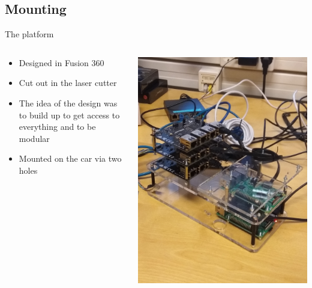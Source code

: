 \documentclass{beamer}
\begin{document}
\subsection{Mounting}
\begin{frame}{The platform}

    \begin{columns}
        \begin{column}{0.47\textwidth}
            \begin{itemize}
                \item  Designed in Fusion 360
                \item  Cut out in the laser cutter
                \item  The idea of the design was to build up to get access to everything and to be modular
                \item Mounted on the car via two holes 
            \end{itemize}
        \end{column}
        \begin{column}{0.5\textwidth}
            \includegraphics[width=0.7\linewidth]{platform.jpg}
            \label{fig:platform}
        \end{column}
    \end{columns}
\end{frame}
\end{document}
